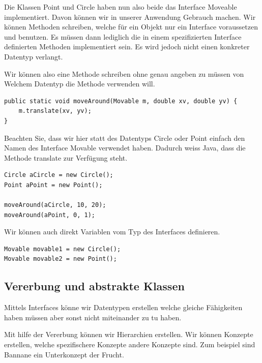 \documentclass[12pt]{article}
\begin{document}
    Die Klassen Point und Circle haben nun also beide das Interface Moveable implementiert. Davon können wir in unserer Anwendung Gebrauch machen. 
    Wir können Methoden schreiben, welche für ein Objekt nur ein Interface voraussetzen und benutzen. 
    Es müssen dann lediglich die in einem spezifizierten Interface definierten Methoden implementiert sein. 
    Es wird jedoch nicht einen konkreter Datentyp verlangt.

    Wir können also eine Methode schreiben ohne genau angeben zu müssen von Welchem Datentyp die Methode verwenden will. 

    \begin{lstlisting}[caption=moveAround]
public static void moveAround(Movable m, double xv, double yv) {
    m.translate(xv, yv);
}
    \end{lstlisting}

    Beachten Sie, dass wir hier statt des Datentyps Circle oder Point einfach den Namen des Interface Movable verwendet haben. 
    Dadurch weiss Java, dass die Methode translate zur Verfügung steht.

    \begin{lstlisting}[caption=verschieben Objekte]
Circle aCircle = new Circle();
Point aPoint = new Point();

moveAround(aCircle, 10, 20);
moveAround(aPoint, 0, 1);
    \end{lstlisting}

    Wir können auch direkt Variablen vom Typ des Interfaces definieren. 

    \begin{lstlisting}[caption=Interface nutzung]
Movable movable1 = new Circle();
Movable movable2 = new Point();
    \end{lstlisting}

    \subsection*{Vererbung und abstrakte Klassen}

    Mittels Interfaces könne wir Datentypen erstellen welche gleiche Fähigkeiten haben müssen
    aber sonst nicht miteinander zu tu haben. 

    Mit hilfe der Vererbung können wir Hierarchien erstellen. Wir können Konzepte erstellen, welche spezifischere Konzepte andere Konzepte sind. 
    Zum beispiel sind Bannane ein Unterkonzept der Frucht. 
\end{document}
